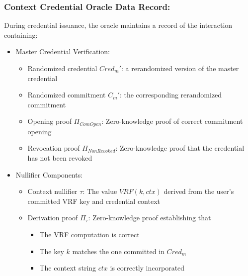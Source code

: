 \subsubsection{Context Credential Oracle Data Record:} During credential issuance, the oracle maintains a record of the interaction containing:
\begin{itemize}
    \item Master Credential Verification: 
        \begin{itemize}
            \item Randomized credential $Cred_m'$: a rerandomized version of the master credential
            \item Randomized commitment $C_m'$: the corresponding rerandomized commitment
            \item Opening proof $\Pi_{ComOpen}$: Zero-knowledge proof of correct commitment opening
            \item Revocation proof $\Pi_{NonRevoked}$:  Zero-knowledge proof that the credential has not been revoked
        \end{itemize}
    \item Nullifier Components:
    \begin{itemize}
        \item Context nullifier $\tau$: The value $VRF(k,ctx)$ derived from the user's committed VRF key and credential context
        \item Derivation proof $\Pi_{\tau}$: Zero-knowledge proof establishing that
        \begin{itemize}
            \item The VRF computation is correct
            \item The key $k$ matches the one committed in $Cred_m$
            \item The context string $ctx$ is correctly incorporated
        \end{itemize}
    \end{itemize}
\end{itemize}

